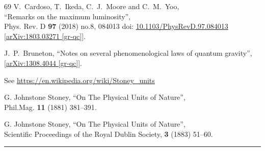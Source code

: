 \documentclass[12pt]{article}
\newcommand{\blue}[1]{{\color{blue} #1}}
\begin{document}
\begin{thebibliography}{69}
V.~Cardoso, T.~Ikeda, C.~J.~Moore and C.~M.~Yoo,\\
``Remarks on the maximum luminosity'',\\
Phys. Rev. D \textbf{97} (2018) no.8, 084013
doi: \href{https://doi.org/10.1103/PhysRevD.97.084013}{10.1103/PhysRevD.97.084013}
[\href{https://www.arxiv.org/abs/1803.03271}{arXiv:1803.03271 [gr-qc]}].

J.~P.~Bruneton,
``Notes on several phenomenological laws of quantum gravity'',
[\href{https://www.arxiv.org/abs/1308.4044}{arXiv:1308.4044 [gr-qc]}].

\enlargethispage{20pt}

See \url{https://en.wikipedia.org/wiki/Stoney_units}

 G. Johnstone Stoney, ``On The Physical Units of Nature'', \\
 Phil.Mag. {\bf11} (1881) 381--391.
 
G. Johnstone Stoney, ``On The Physical Units of Nature'', \\
Scientific Proceedings of the Royal Dublin Society, {\bf3} (1883) 51--60. 

\bigskip
\blue{\bf\hrule}
\bigskip





\end{thebibliography}
\end{document}
